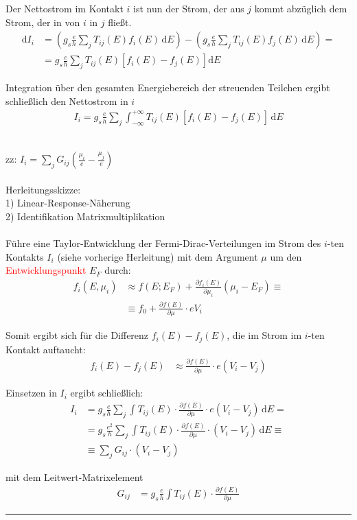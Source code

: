 \documentclass{article}
\newcommand{\diff}{\mathrm{d}}
\newcommand{\lr}[1]{\left(#1\right)}
\newcommand{\lreck}[1]{\left[#1\right]}
\begin{document}
{	Der Nettostrom im Kontakt $i$ ist nun der Strom, der aus $j$ kommt abzüglich dem Strom, der in von $i$ in $j$ fließt.
		\begin{align*}
			\diff I_i &= \lr{ g_s \frac{e}{h} \sum_j T_{ij}(E) f_i(E) \, \diff E } - \lr{ g_s \frac{e}{h} \sum_j T_{ij}(E) f_j(E) \, \diff E } = \\
			&= g_s \frac{e}{h} \sum_j T_{ij}(E) \lreck{ f_i(E) - f_j(E) } \diff E
		\end{align*}
	
	Integration über den gesamten Energiebereich der streuenden Teilchen ergibt schließlich den Nettostrom in $i$
		\begin{align*}
			I_i = g_s \frac{e}{h} \sum_j \int_{-\infty}^{+\infty} T_{ij}(E) \lreck{ f_i(E) - f_j(E) } \, \diff E
		\end{align*}


	\\
	zz: $I_i = \sum_j G_{ij} \lr{ \frac{\mu_i}{e} - \frac{\mu_j}{e} }$\\
	\\
	Herleitungsskizze:\\
	1) Linear-Response-Näherung \\
	2) Identifikation Matrixmultiplikation \\
	\\
	Führe eine Taylor-Entwicklung der Fermi-Dirac-Verteilungen im Strom des $i$-ten Kontakts $I_i$ \textcolor{gruen}{(siehe vorherige Herleitung)} mit dem Argument $\mu$ um den \textcolor{red}{Entwicklungspunkt} $E_F$ durch:
		\begin{align*}
			f_i(E,\mu_i) &\approx f(E;E_F) + \frac{\partial f_i(E)}{\partial \mu_i} (\mu_i - E_F) \equiv \\
			&\equiv f_0 + \frac{\partial f(E)}{\partial \mu} \cdot eV_i
		\end{align*}
	
	Somit ergibt sich für die Differenz $f_i(E) - f_j(E)$, die im Strom im $i$-ten Kontakt auftaucht:
		\begin{align*}
			f_i(E) - f_j(E) &\approx \frac{\partial f(E)}{\partial \mu} \cdot e(V_i - V_j)
		\end{align*}

	Einsetzen in $I_i$ ergibt schließlich:
		\begin{align*}
			I_i &= g_s \frac{e}{h} \sum_j \int T_{ij}(E) \cdot \frac{\partial f(E)}{\partial \mu} \cdot e(V_i - V_j) \, \diff E = \\
			&= g_s \frac{e^2}{h} \sum_j \int T_{ij}(E) \cdot \frac{\partial f(E)}{\partial \mu} \cdot (V_i - V_j) \, \diff E \equiv \\
			&\equiv \sum_j G_{ij} \cdot (V_i - V_j)
		\end{align*}

	mit dem Leitwert-Matrixelement
		\begin{align*}
			G_{ij} &= g_s \frac{e}{h} \int T_{ij}(E) \cdot \frac{\partial f(E)}{\partial \mu}
		\end{align*}


\hrule
}
\end{document}
